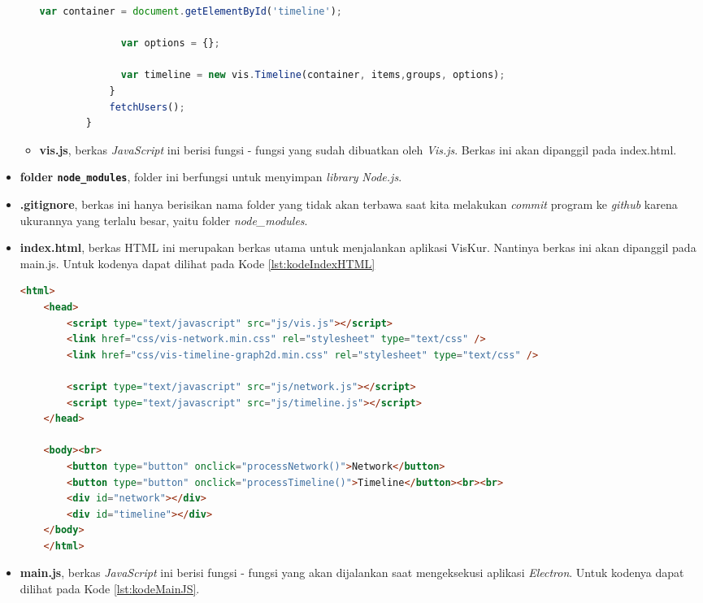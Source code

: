 \begin{itemize}
\begin{itemize}
\begin{lstlisting}[language=JavaScript, caption=Kode \textit{timeline.js}\label{lst:kodeTimelineJs}]
              var container = document.getElementById('timeline');
        
              var options = {};
        
              var timeline = new vis.Timeline(container, items,groups, options); 
            }
            fetchUsers();
        }
        \end{lstlisting}
        
        \item \textbf{vis.js}, berkas \textit{JavaScript} ini berisi fungsi - fungsi yang sudah dibuatkan oleh \textit{Vis.js}. Berkas ini akan dipanggil pada index.html.
    \end{itemize}
    
    \item \textbf{folder \texttt{node\_modules}}, folder ini berfungsi untuk menyimpan \textit{library} \textit{Node.js}.
    
    \item \textbf{.gitignore}, berkas ini hanya berisikan nama folder yang tidak akan terbawa saat kita melakukan \textit{commit} program ke \textit{github} karena ukurannya yang terlalu besar, yaitu folder \textit{node\_modules}.
    
    \item \textbf{index.html}, berkas HTML ini merupakan berkas utama untuk menjalankan aplikasi VisKur. Nantinya berkas ini akan dipanggil pada main.js. Untuk kodenya dapat dilihat pada Kode \ref{lst:kodeIndexHTML}
    
    \begin{lstlisting}[language=html, caption=Kode \textit{index.html}\label{lst:kodeIndexHTML}]
    <html>
    <head>
        <script type="text/javascript" src="js/vis.js"></script>
        <link href="css/vis-network.min.css" rel="stylesheet" type="text/css" />
        <link href="css/vis-timeline-graph2d.min.css" rel="stylesheet" type="text/css" />
    
        <script type="text/javascript" src="js/network.js"></script>
        <script type="text/javascript" src="js/timeline.js"></script>
    </head>
    
    <body><br>
        <button type="button" onclick="processNetwork()">Network</button>
        <button type="button" onclick="processTimeline()">Timeline</button><br><br>
        <div id="network"></div>
        <div id="timeline"></div>
    </body>
    </html>
    \end{lstlisting}
    
    \item \textbf{main.js}, berkas \textit{JavaScript} ini berisi fungsi - fungsi yang akan dijalankan saat mengeksekusi aplikasi \textit{Electron}. Untuk kodenya dapat dilihat pada Kode \ref{lst:kodeMainJS}.
    

\end{itemize}
